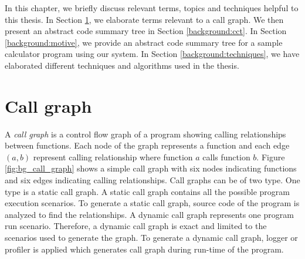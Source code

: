 
\label{chapter:background}

In this chapter, we briefly discuss relevant terms, topics and techniques helpful to this thesis. In Section \ref{background:call_graph}, we elaborate terms relevant to a call graph. We then present an  abstract code summary tree in Section \ref{background:cct}. In Section \ref{background:motive}, we provide an abstract code summary tree for a sample calculator program using our system. In Section \ref{background:techniques}, we have elaborated different techniques and algorithms used in the thesis. 

\section{Call graph}
\label{background:call_graph}
A \emph{call graph} is a control flow graph of a program showing calling relationships between functions. Each node of the graph represents a function and each edge $(a, b)$ represent calling relationship where function $a$ calls function $b$. Figure \ref{fig:bg_call_graph} shows a simple call graph with six nodes indicating functions and six edges indicating calling relationships. Call graphs can be of two type. One type is a static call graph. A static call graph contains all the possible program execution scenarios. To generate a static call graph, source code of the program is analyzed to find the relationships. A dynamic call graph represents one program run scenario. Therefore, a dynamic call graph is exact and limited to the scenarios used to generate the graph. To generate a dynamic call graph, logger or profiler is applied which generates call graph during run-time of the program.

